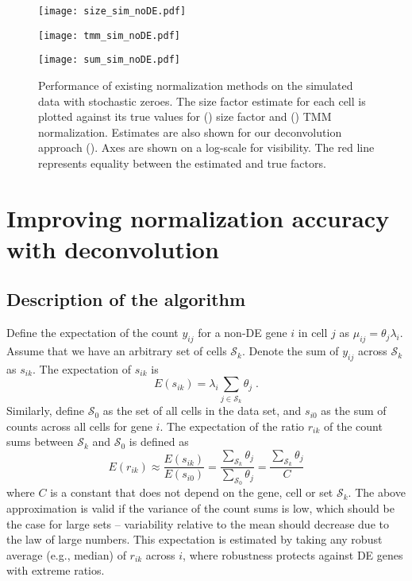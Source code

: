 \documentclass{article}
\begin{document}
\begin{figure}[tb]
\begin{minipage}{0.33\textwidth}
\texttt{[image: size\_sim\_noDE.pdf]}
\subcaption{}\label{subfig:size_noDE}
\end{minipage}
\begin{minipage}{0.33\textwidth}
\texttt{[image: tmm\_sim\_noDE.pdf]}
\subcaption{}\label{subfig:tmm_noDE}
\end{minipage}
\begin{minipage}{0.33\textwidth}
\texttt{[image: sum\_sim\_noDE.pdf]}
\subcaption{}\label{subfig:sum_noDE}
\end{minipage}
\caption{
    Performance of existing normalization methods on the simulated data with stochastic zeroes.
    The size factor estimate for each cell is plotted against its true values for () size factor and () TMM normalization.
    Estimates are also shown for our deconvolution approach ().
    Axes are shown on a log-scale for visibility.
    The red line represents equality between the estimated and true factors.
}
\label{fig:sim_noDE}
\end{figure}

\section{Improving normalization accuracy with deconvolution}

\subsection{Description of the algorithm}
Define the expectation of the count $y_{ij}$ for a non-DE gene $i$ in cell $j$ as $\mu_{ij} = \theta_j\lambda_i$.
Assume that we have an arbitrary set of cells $\mathcal{S}_k$.
Denote the sum of $y_{ij}$ across $\mathcal{S}_k$ as $s_{ik}$.
The expectation of $s_{ik}$ is
\[
    E(s_{ik}) = \lambda_i \sum_{j \in \mathcal{S}_k} \theta_j \;.
\]
Similarly, define $\mathcal{S}_0$ as the set of all cells in the data set, and $s_{i0}$ as the sum of counts across all cells for gene $i$.
The expectation of the ratio $r_{ik}$ of the count sums between $\mathcal{S}_k$ and $\mathcal{S}_0$ is defined as
\begin{equation}
    E(r_{ik}) \approx \frac{E(s_{ik})}{E(s_{i0})} = \frac{\sum_{\mathcal{S}_k} \theta_j}{\sum_{\mathcal{S}_0} \theta_j} = \frac{\sum_{\mathcal{S}_k} \theta_j}{C}
    \label{eqn:linear_single}
\end{equation}
where $C$ is a constant that does not depend on the gene, cell or set $\mathcal{S}_k$.
The above approximation is valid if the variance of the count sums is low, which should be the case for large sets 
    -- variability relative to the mean should decrease due to the law of large numbers.
This expectation is estimated by taking any robust average (e.g., median) of $r_{ik}$ across $i$, where robustness protects against DE genes with extreme ratios.
\end{document}
